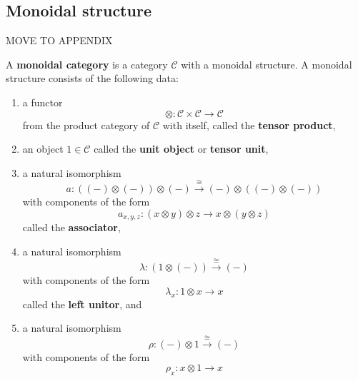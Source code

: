 \subsection{Monoidal structure} %
\label{sec:Monoidal structure}
MOVE TO APPENDIX
\begin{definition}
  A \textbf{monoidal category} is a category $ \mathcal{C} $ with a monoidal structure. A monoidal structure consists of the following data:
  \begin{enumerate}[label=(\roman*)]
    \item a functor
      \begin{equation}
        \otimes: \mathcal{C} \times \mathcal{C} \to \mathcal{C}
        \label{eq:tensor}
      \end{equation}
      from the product category of $ \mathcal{C} $ with itself, called the \textbf{tensor product},
    \item an object $ 1 \in \mathcal{C} $ called the \textbf{unit object} or \textbf{tensor unit},
    \item a natural isomorphism
      \begin{equation}
        a: ((-) \otimes (-)) \otimes (-) \xrightarrow{\cong} (-) \otimes ((-) \otimes (-))
        \label{eq:associator}
      \end{equation}
      with components of the form
      \begin{equation}
        a_{x,y,z}: (x \otimes y) \otimes z \to x \otimes (y \otimes z)
        \label{eq:compformasso}
      \end{equation}
      called the \textbf{associator},
    \item a natural isomorphism
      \begin{equation}
        \lambda: (1 \otimes (-)) \xrightarrow{\cong} (-)
        \label{eq:leftunit}
      \end{equation}
      with components of the form
      \begin{equation}
        \lambda_x: 1 \otimes x \to x
      \end{equation}
      called the \textbf{left unitor}, and
    \item a natural isomorphism
      \begin{equation}
        \rho: (-) \otimes 1 \xrightarrow{\cong} (-)
        \label{eq:rightunit}
      \end{equation}
      with components of the form
      \begin{equation}
      \rho_x: x \otimes 1 \to x
      \end{equation}

\end{enumerate}
\end{definition}
